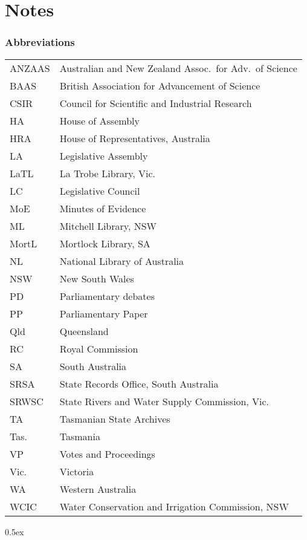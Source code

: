 
\chapter{Notes}
\label{ch:notes}


\small

\subsection*{Abbreviations} 

\begin{tabular}{ll}
	ANZAAS	& Australian and New Zealand Assoc.\ for Adv.\ of
                              Science\\
       	BAAS	& British Association for Advancement of Science\\
	CSIR    & Council for Scientific and Industrial Research\\
        HA      & House of Assembly\\
	HRA	& House of Representatives, Australia\\
        LA      & Legislative Assembly\\
	LaTL	& La Trobe Library, Vic.\\
        LC      & Legislative Council\\
	MoE	& Minutes of Evidence\\
	ML	& Mitchell Library, NSW\\
	MortL	& Mortlock Library, SA\\
	NL      & National Library of Australia\\
	NSW	& New South Wales\\
	PD	& Parliamentary debates\\
	PP	& Parliamentary Paper\\
	Qld	& Queensland\\
	RC	& Royal Commission\\
	SA	& South Australia\\
	SRSA	& State Records Office, South Australia\\
	SRWSC   & State Rivers and Water Supply Commission, Vic.\\
	TA	& Tasmanian State Archives\\
	Tas.	& Tasmania\\
	VP	& Votes and Proceedings\\
	Vic.	& Victoria\\
	WA	& Western Australia\\
	WCIC    & Water Conservation and Irrigation Commission, NSW
\end{tabular}

\begingroup
\parindent 0pt
\parskip   0.5ex
\renewcommand{\enotesize}{\small}
\theendnotes
\endgroup



%
